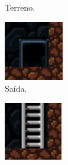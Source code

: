 \begin{figure}[H]
\begin{subfigure}[b]{0.15\textwidth}
		\caption{Terreno.}
	\end{subfigure}
	\begin{subfigure}[b]{0.15\textwidth}
        \includegraphics[width=\textwidth]{fig/spelunky-end-door.pdf}
		\caption{Saída.}
	\end{subfigure}
	\begin{subfigure}[b]{0.15\textwidth}
        \includegraphics[width=\textwidth]{fig/spelunky-stair.pdf}

\end{subfigure}
\end{figure}
